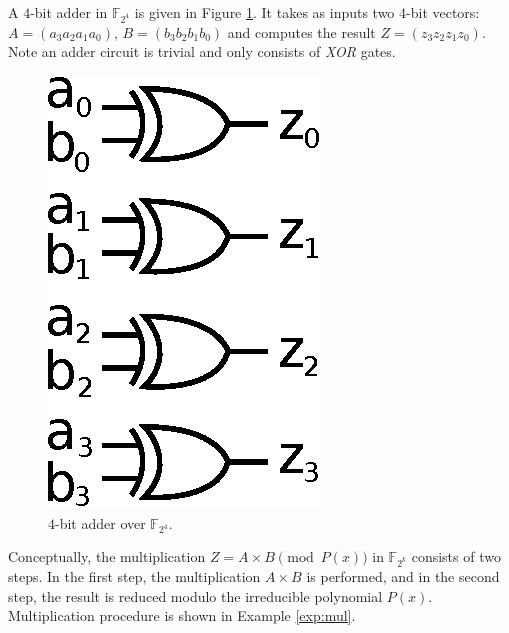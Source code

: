 \begin{Example}
A $4$-bit adder in $\mathbb{F}_{2^4}$ is given in Figure \ref{fig:adder4}. 
It takes as inputs two $4$-bit vectors: $A=(a_{3}a_{2}a_{1}a_{0})$, $B=(b_{3}b_{2}b_{1}b_{0})$ 
and computes the result $Z=(z_{3}z_{2}z_{1}z_{0})$. 
Note an adder circuit is trivial and only consists of {\it XOR} gates.
	\begin{figure}[b]
	\begin{center}
	\includegraphics[scale=0.8]{figures/adder4bit.eps}
	\end{center}
	\caption{$4$-bit adder over $\mathbb{F}_{2^4}$.}
	\label{fig:adder4}
\end{figure}
\end{Example}


Conceptually, the multiplication $Z =A\times B \pmod{ P(x) }$ in $\mathbb{F}_{2^k}$ consists of two steps.
In the first step, the multiplication $A\times B$ is performed, and in the second step, the result is reduced
modulo the irreducible polynomial $P(x)$.
Multiplication procedure is shown in Example \ref{exp:mul}.

